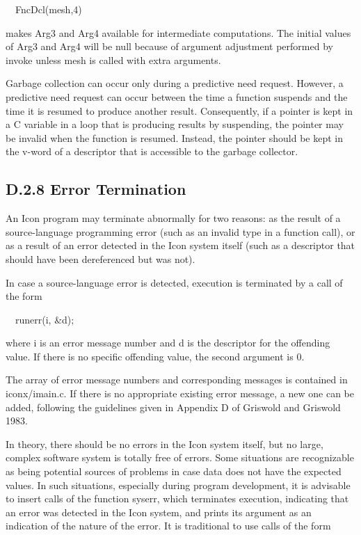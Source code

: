 {\ttfamily\mdseries
\ \ FncDcl(mesh,4)}

\noindent makes Arg3 and Arg4 available for intermediate
computations. The initial values of Arg3 and Arg4 will be null because
of argument adjustment performed by invoke unless mesh is called with
extra arguments.

Garbage collection can occur only during a predictive need
request. However, a predictive need request can occur between the time
a function suspends and the time it is resumed to produce another
result. Consequently, if a pointer is kept in a C variable in a loop
that is producing results by suspending, the pointer may be invalid
when the function is resumed. Instead, the pointer should be kept in
the v-word of a descriptor that is accessible to the garbage
collector.

\subsection{D.2.8 Error Termination}

An Icon program may terminate abnormally for two reasons: as the
result of a source-language programming error (such as an invalid type
in a function call), or as a result of an error detected in the Icon
system itself (such as a descriptor that should have been dereferenced
but was not).

In case a source-language error is detected, execution is terminated
by a call of the form

{\ttfamily\mdseries
\ \ runerr(i, \&d);}

\noindent where i is an error message number and d is the descriptor
for the offending value. If there is no specific offending value, the
second argument is 0.

The array of error message numbers and corresponding messages is
contained in iconx/imain.c. If there is no appropriate existing error
message, a new one can be added, following the guidelines given in
Appendix D of Griswold and Griswold 1983.

In theory, there should be no errors in the Icon system itself, but no
large, complex software system is totally free of errors. Some
situations are recognizable as being potential sources of problems in
case data does not have the expected values. In such situations,
especially during program development, it is advisable to insert calls
of the function syserr, which terminates execution, indicating that an
error was detected in the Icon system, and prints its argument as an
indication of the nature of the error. It is traditional to use calls
of the form

